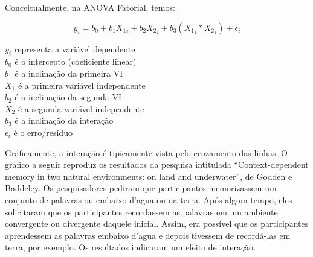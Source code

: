 \documentclass[
]{book}
\begin{document}
Conceitualmente, na ANOVA Fatorial, temos:

\[y_i = b_0 + b_1X{_1}_i + b_2X{_2}_i + b_3(X{_1}_i * X{_2}_i) + \epsilon_{i}\]

\(y_i\) representa a variável dependente\\
\(b_0\) é o intercepto (coeficiente linear)\\
\(b_1\) é a inclinação da primeira VI\\
\(X_1\) é a primeira variável independente\\
\(b_2\) é a inclinação da segunda VI\\
\(X_2\) é a segunda variável independente\\
\(b_3\) é a inclinação da interação\\
\(\epsilon_{i}\) é o erro/resíduo

Graficamente, a interação é tipicamente vista pelo cruzamento das linhas. O gráfico a seguir reproduz os resultados da pesquisa intitulada ``Context-dependent memory in two natural environments: on land and underwater'', de Godden e Baddeley. Os pesquisadores pediram que participantes memorizassem um conjunto de palavras ou embaixo d'agua ou na terra. Após algum tempo, eles solicitaram que os participantes recordassem as palavras em um ambiente convergente ou divergente daquele inicial. Assim, era possível que os participantes aprendessem as palavras embaixo d'agua e depois tivessem de recordá-las em terra, por exemplo. Os resultados indicaram um efeito de interação.
\end{document}
